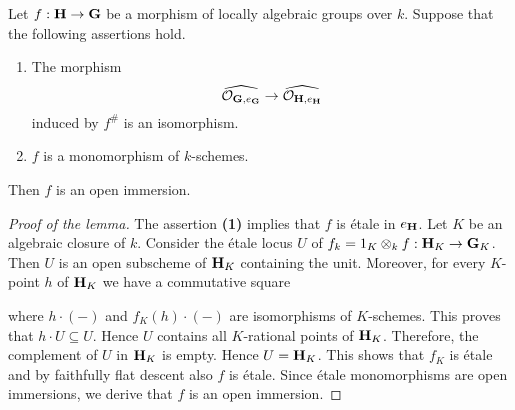 \begin{lemma}\label{lemma:infinitesimal_isomorphisms}
Let $f:\mathbf{H}\rightarrow \mathbf{G}$ be a morphism of locally algebraic groups over $k$. Suppose that the following assertions hold.
\begin{enumerate}[label=\emph{\textbf{(\arabic*)}}, leftmargin=3.0em]
\item The morphism
$$\widehat{{\mathcal O}_{\mathbf{G},e_{\mathbf{G}}}} \rightarrow  \widehat{{\mathcal O}_{\mathbf{H},e_{\mathbf{H}}}}$$
induced by $f^{\#}$ is an isomorphism.
\item $f$ is a monomorphism of $k$-schemes.
\end{enumerate}
Then $f$ is an open immersion.
\end{lemma}
\begin{proof}[Proof of the lemma]
The assertion \textbf{(1)} implies that $f$ is {\'e}tale in $e_{\mathbf{H}}$. Let $K$ be an algebraic closure of $k$. Consider the {\'e}tale locus $U$ of $f_k = 1_K\otimes_kf:\mathbf{H}_K\rightarrow \mathbf{G}_K$. Then $U$ is an open subscheme of $\mathbf{H}_K$ containing the unit. Moreover, for every $K$-point $h$ of $\mathbf{H}_K$ we have a commutative square
\begin{center}
\end{center}
where $h\cdot (-)$ and $f_K(h)\cdot (-)$ are isomorphisms of $K$-schemes. This proves that $h\cdot U\subseteq U$. Hence $U$ contains all $K$-rational points of $\mathbf{H}_K$. Therefore, the complement of $U$ in $\mathbf{H}_K$ is empty. Hence $U = \mathbf{H}_K$. This shows that $f_K$ is {\'e}tale and by faithfully flat descent also $f$ is {\'e}tale. Since {\'e}tale monomorphisms are open immersions, we derive that $f$ is an open immersion.
\end{proof}

